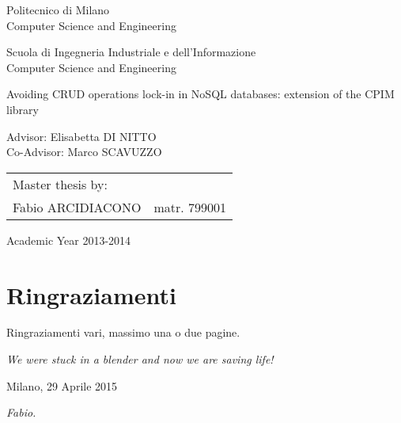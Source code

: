 \begin{titlepage}
\vspace*{-2.5cm}
\bfseries
\begin{center}
  \LARGE
  Politecnico di Milano\\
  \Large
  Computer Science and Engineering\\


\begin{large}
Scuola di Ingegneria Industriale e dell'Informazione\\
Computer Science and Engineering\\
\end{large}

\vspace{2.0cm}
\begin{Large}
Avoiding CRUD operations lock-in in NoSQL databases: extension of the CPIM library
\end{Large}  
\end{center}

\vspace*{4cm}
\large
\begin{flushleft}
\hspace{-2cm}  Advisor: Elisabetta DI NITTO\\
\hspace{-2cm}  Co-Advisor: Marco SCAVUZZO\\
\end{flushleft}
\vspace*{1.5cm}

\hspace{6cm}
\parbox{10cm}{
    \begin{tabular}{ll}
         Master thesis by: & \\
         Fabio ARCIDIACONO & matr. 799001\\
    \end{tabular}
}

\vspace*{2cm}
\begin{center}
  Academic Year 2013-2014
\end{center}

\end{titlepage}
\cleardoublepage

\thispagestyle{empty}

\chapter*{Ringraziamenti}
Ringraziamenti vari, massimo una o due pagine.

\noindent \textit{We were stuck in a blender and now we are saving life!}

\begin{flushleft}
Milano, 29 Aprile 2015
\end{flushleft}

\begin{flushright}
\emph{Fabio.}
\end{flushright}

\cleardoublepage